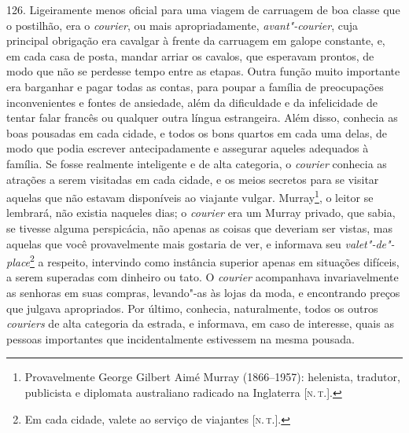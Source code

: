 126. Ligeiramente menos oficial para uma viagem de carruagem de boa
classe que o postilhão, era o \emph{courier}, ou mais apropriadamente,
\emph{avant"-courier}, cuja principal obrigação era cavalgar à frente da
carruagem em galope constante, e, em cada casa de posta, mandar arriar
os cavalos, que esperavam prontos, de modo que não se perdesse tempo
entre as etapas. Outra função muito importante era barganhar e pagar
todas as contas, para poupar a família de preocupações inconvenientes e
fontes de ansiedade, além da dificuldade e da infelicidade de tentar
falar francês ou qualquer outra língua estrangeira. Além disso, conhecia
as boas pousadas em cada cidade, e todos os bons quartos em cada uma
delas, de modo que podia escrever antecipadamente e assegurar aqueles
adequados à família. Se fosse realmente inteligente e de alta categoria,
o \emph{courier} conhecia as atrações a serem visitadas em cada cidade,
e os meios secretos para se visitar aquelas que não estavam disponíveis
ao viajante vulgar. Murray\footnote{Provavelmente George Gilbert Aimé
  Murray (1866--1957): helenista, tradutor, publicista e diplomata
  australiano radicado na Inglaterra {[}\textsc{n.\,t.}{]}.}, o leitor se
lembrará, não existia naqueles dias; o \emph{courier} era um Murray
privado, que sabia, se tivesse alguma perspicácia, não apenas as coisas
que deveriam ser vistas, mas aquelas que você provavelmente mais
gostaria de ver, e informava seu \emph{valet"-de"-place}\footnote{Em cada
  cidade, valete ao serviço de viajantes {[}\textsc{n.\,t.}{]}.} a respeito,
intervindo como instância superior apenas em situações difíceis, a serem
superadas com dinheiro ou tato. O \emph{courier} acompanhava
invariavelmente as senhoras em suas compras, levando"-as às lojas da
moda, e encontrando preços que julgava apropriados. Por último,
conhecia, naturalmente, todos os outros \emph{couriers} de alta
categoria da estrada, e informava, em caso de interesse, quais as
pessoas importantes que incidentalmente estivessem na mesma pousada.

